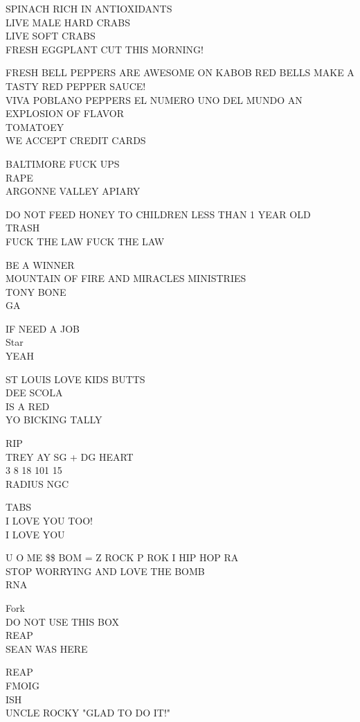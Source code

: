 \documentclass[10pt,letterpaper]{article}
\begin{document}
SPINACH RICH IN ANTIOXIDANTS\\
LIVE MALE HARD CRABS\\
LIVE SOFT CRABS\\
FRESH EGGPLANT CUT THIS MORNING!

FRESH BELL PEPPERS ARE AWESOME ON KABOB RED BELLS MAKE A TASTY RED PEPPER SAUCE!\\
VIVA POBLANO PEPPERS EL NUMERO UNO DEL MUNDO AN EXPLOSION OF FLAVOR\\
TOMATOEY\\
WE ACCEPT CREDIT CARDS

BALTIMORE FUCK UPS\\
RAPE\\
ARGONNE VALLEY APIARY

DO NOT FEED HONEY TO CHILDREN LESS THAN 1 YEAR OLD\\
TRASH\\
FUCK THE LAW FUCK THE LAW

BE A WINNER\\
MOUNTAIN OF FIRE AND MIRACLES MINISTRIES\\
TONY BONE\\
GA

IF NEED A JOB\\
Star\\
YEAH

ST LOUIS LOVE KIDS BUTTS\\
DEE SCOLA\\
IS A RED\\
YO BICKING TALLY

RIP\\
TREY AY SG + DG HEART\\
3 8 18 101 15\\
RADIUS NGC

TABS\\
I LOVE YOU TOO!\\
I LOVE YOU

U O ME \$\$ BOM = Z ROCK P ROK I HIP HOP RA\\
STOP WORRYING AND LOVE THE BOMB\\
RNA

Fork\\
DO NOT USE THIS BOX\\
REAP\\
SEAN WAS HERE

REAP\\
FMOIG\\
ISH\\
UNCLE ROCKY "GLAD TO DO IT!"
\end{document}
